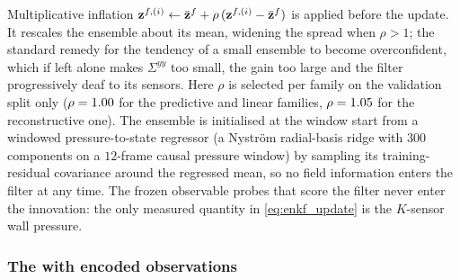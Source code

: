 Multiplicative inflation $\mathbf{z}^{f,(i)} \leftarrow \bar{\mathbf{z}}^{f} +
\rho\,(\mathbf{z}^{f,(i)} - \bar{\mathbf{z}}^{f})$ is applied before the update. It
rescales the ensemble about its mean, widening the spread when $\rho > 1$; the
standard remedy for the tendency of a small ensemble to become overconfident,
which if left alone makes $\Sigma^{yy}$ too small, the gain too large and the
filter progressively deaf to its sensors. Here $\rho$ is selected per family on
the validation split only ($\rho = 1.00$ for the predictive and linear
families, $\rho = 1.05$ for the reconstructive one). The ensemble is
initialised at the window start from a windowed pressure-to-state regressor (a
Nystr\"om radial-basis ridge with $300$ components on a $12$-frame causal
pressure window) by sampling its training-residual covariance around the
regressed mean, so no field information enters the filter at any time. The
frozen observable probes that score the filter never enter the innovation: the
only measured quantity in \eqref{eq:enkf_update} is the $K$-sensor wall
pressure.\re

\subsubsection{The \LinLatKF{} with encoded observations}
\label{sec:methods_lae}

